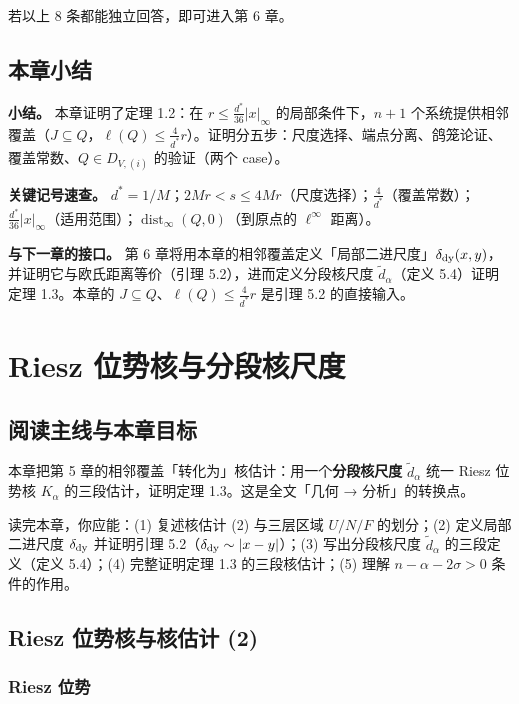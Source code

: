 \documentclass[a4paper,11pt,openany]{ctexbook}
\numberwithin{equation}{chapter}
\numberwithin{figure}{chapter}
\numberwithin{table}{chapter}
\begin{document}
若以上 8 条都能独立回答，即可进入第 6 章。

\section{本章小结}

\textbf{小结。} 本章证明了定理 1.2：在 $r\le\frac{d^*}{36}|x|_\infty$ 的局部条件下，$n+1$ 个系统提供相邻覆盖（$J\subseteq Q$，$\ell(Q)\le\frac4{d^*}r$）。证明分五步：尺度选择、端点分离、鸽笼论证、覆盖常数、$Q\in D_{V,(i)}$ 的验证（两个 case）。

\textbf{关键记号速查。} $d^*=1/M$；$2Mr<s\le4Mr$（尺度选择）；$\frac4{d^*}$（覆盖常数）；$\frac{d^*}{36}|x|_\infty$（适用范围）；$\operatorname{dist}_\infty(Q,0)$（到原点的 $\ell^\infty$ 距离）。

\textbf{与下一章的接口。} 第 6 章将用本章的相邻覆盖定义「局部二进尺度」$\delta_{\rm dy}(x,y)$，并证明它与欧氏距离等价（引理 5.2），进而定义分段核尺度 $\widetilde d_\alpha$（定义 5.4）证明定理 1.3。本章的 $J\subseteq Q$、$\ell(Q)\le\frac4{d^*}r$ 是引理 5.2 的直接输入。


\clearpage

\chapter{Riesz 位势核与分段核尺度}
\section{阅读主线与本章目标}

本章把第 5 章的相邻覆盖「转化为」核估计：用一个\textbf{分段核尺度} $\widetilde d_\alpha$ 统一 Riesz 位势核 $K_\alpha$ 的三段估计，证明定理 1.3。这是全文「几何 → 分析」的转换点。

读完本章，你应能：(1) 复述核估计 (2) 与三层区域 $U/N/F$ 的划分；(2) 定义局部二进尺度 $\delta_{\rm dy}$ 并证明引理 5.2（$\delta_{\rm dy}\sim|x-y|$）；(3) 写出分段核尺度 $\widetilde d_\alpha$ 的三段定义（定义 5.4）；(4) 完整证明定理 1.3 的三段核估计；(5) 理解 $n-\alpha-2\sigma>0$ 条件的作用。

\section{Riesz 位势核与核估计 (2)}

\subsection{Riesz 位势}
\end{document}
